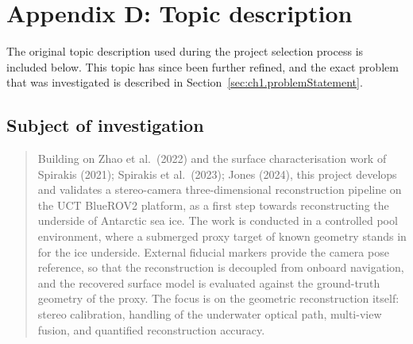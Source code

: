 %
%
%

\chapter*{Appendix D: Topic description}
The original topic description used during the project selection process is
included below. This topic has since been further refined, and the exact
problem that was investigated is described in
Section~\ref{sec:ch1.problemStatement}.

\section*{Subject of investigation}
\begin{quote}
Building on Zhao et al.\ (2022) and the surface characterisation work of Spirakis (2021); Spirakis et al.\ (2023);
Jones (2024), this project develops and validates a stereo-camera three-dimensional reconstruction pipeline on the
UCT BlueROV2 platform, as a first step towards reconstructing the underside of Antarctic sea ice. The work is
conducted in a controlled pool environment, where a submerged proxy target of known geometry stands in for the ice
underside. External fiducial markers provide the camera pose reference, so that the reconstruction is decoupled from
onboard navigation, and the recovered surface model is evaluated against the ground-truth geometry of the proxy. The
focus is on the geometric reconstruction itself: stereo calibration, handling of the underwater optical path,
multi-view fusion, and quantified reconstruction accuracy.
\end{quote}

